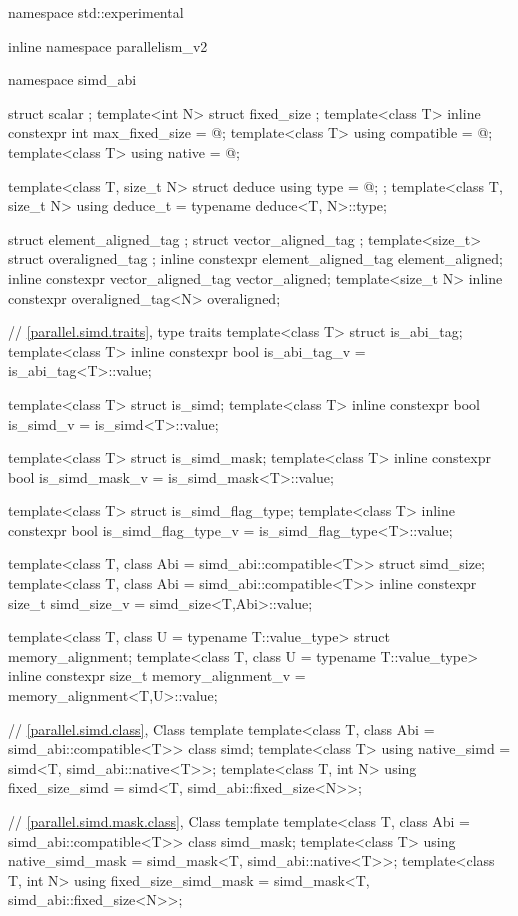 \begin{codeblock}
namespace std::experimental {
  inline namespace parallelism_v2 {
    namespace simd_abi {
      struct scalar {};
      template<int N> struct fixed_size {};
      template<class T> inline constexpr int max_fixed_size = @\impdef@;
      template<class T> using compatible = @\impdef@;
      template<class T> using native = @\impdef@;

      template<class T, size_t N> struct deduce { using type = @\seebelow@; };
      template<class T, size_t N> using deduce_t = typename deduce<T, N>::type;
    }

    struct element_aligned_tag {};
    struct vector_aligned_tag {};
    template<size_t> struct overaligned_tag {};
    inline constexpr element_aligned_tag element_aligned{};
    inline constexpr vector_aligned_tag vector_aligned{};
    template<size_t N> inline constexpr overaligned_tag<N> overaligned{};

    // \ref{parallel.simd.traits},  type traits
    template<class T> struct is_abi_tag;
    template<class T> inline constexpr bool is_abi_tag_v = is_abi_tag<T>::value;

    template<class T> struct is_simd;
    template<class T> inline constexpr bool is_simd_v = is_simd<T>::value;

    template<class T> struct is_simd_mask;
    template<class T> inline constexpr bool is_simd_mask_v = is_simd_mask<T>::value;

    template<class T> struct is_simd_flag_type;
    template<class T> inline constexpr bool is_simd_flag_type_v =
    is_simd_flag_type<T>::value;

    template<class T, class Abi = simd_abi::compatible<T>> struct simd_size;
    template<class T, class Abi = simd_abi::compatible<T>>
    inline constexpr size_t simd_size_v = simd_size<T,Abi>::value;

    template<class T, class U = typename T::value_type> struct memory_alignment;
    template<class T, class U = typename T::value_type>
    inline constexpr size_t memory_alignment_v = memory_alignment<T,U>::value;

    // \ref{parallel.simd.class}, Class template 
    template<class T, class Abi = simd_abi::compatible<T>> class simd;
    template<class T> using native_simd = simd<T, simd_abi::native<T>>;
    template<class T, int N> using fixed_size_simd = simd<T, simd_abi::fixed_size<N>>;

    // \ref{parallel.simd.mask.class}, Class template 
    template<class T, class Abi = simd_abi::compatible<T>> class simd_mask;
    template<class T> using native_simd_mask = simd_mask<T, simd_abi::native<T>>;
    template<class T, int N> using fixed_size_simd_mask =
    simd_mask<T, simd_abi::fixed_size<N>>;

}}
\end{codeblock}
